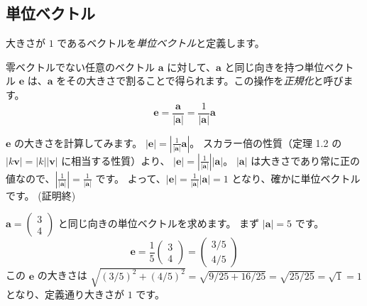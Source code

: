 \subsection{単位ベクトル}
\begin{dfn}[単位ベクトル]
大きさが $1$ であるベクトルを\emph{単位ベクトル}と定義します。
\end{dfn}
\begin{thm}[単位ベクトルの正規化]
零ベクトルでない任意のベクトル $\bm{a}$ に対して、$\bm{a}$ と同じ向きを持つ単位ベクトル $\bm{e}$ は、$\bm{a}$ をその大きさで割ることで得られます。この操作を\emph{正規化}と呼びます。
\[\bm{e} = \frac{\bm{a}}{|\bm{a}|} = \frac{1}{|\bm{a}|} \bm{a}\]
\begin{proof*}
$\bm{e}$ の大きさを計算してみます。
$|\bm{e}| = \left| \frac{1}{|\bm{a}|} \bm{a} \right|$。
スカラー倍の性質（定理 1.2 の $|k\bm{v}| = |k||\bm{v}|$ に相当する性質）より、
$|\bm{e}| = \left| \frac{1}{|\bm{a}|} \right| |\bm{a}|$。
$|\bm{a}|$ は大きさであり常に正の値なので、$|\frac{1}{|\bm{a}|}| = \frac{1}{|\bm{a}|}$ です。
よって、$|\bm{e}| = \frac{1}{|\bm{a}|} |\bm{a}| = 1$ となり、確かに単位ベクトルです。
(証明終)
\end{proof*}
\end{thm}
\begin{ex}
$\bm{a} = \begin{pmatrix} 3 \\ 4 \end{pmatrix}$ と同じ向きの単位ベクトルを求めます。
まず $|\bm{a}| = 5$ です。
\[\bm{e} = \frac{1}{5} \begin{pmatrix} 3 \\ 4 \end{pmatrix} = \begin{pmatrix} 3/5 \\ 4/5 \end{pmatrix}\]
この $\bm{e}$ の大きさは $\sqrt{(3/5)^2 + (4/5)^2} = \sqrt{9/25 + 16/25} = \sqrt{25/25} = \sqrt{1} = 1$ となり、定義通り大きさが $1$ です。
\end{ex}

